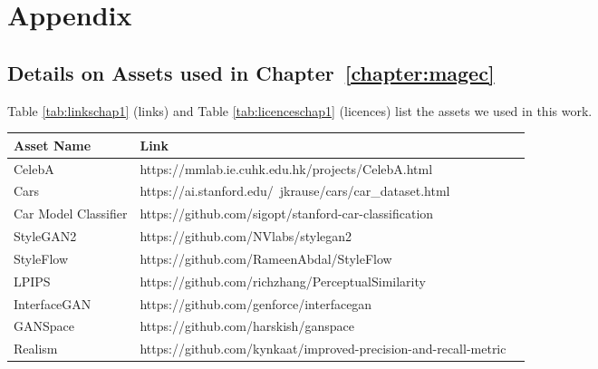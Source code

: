 \chapter{Appendix}
\label{chapter:appendix}

{}



\section{Details on Assets used in Chapter~\ref{chapter:magec}}
\label{sec:MAGEC assets}

Table \ref{tab:linkschap1} (links) and Table \ref{tab:licenceschap1} (licences)
list the assets we used in this work.

\begin{table*}[h]
\hspace{\sizeforappendix}
\small
\begin{tabular}{lll}
\toprule
\textbf{Asset Name} & \textbf{Link} \\
\midrule
CelebA & https://mmlab.ie.cuhk.edu.hk/projects/CelebA.html \\
Cars &  https://ai.stanford.edu/~jkrause/cars/car\_dataset.html \\
Car Model Classifier &  https://github.com/sigopt/stanford-car-classification \\
StyleGAN2 & https://github.com/NVlabs/stylegan2 \\
StyleFlow &  https://github.com/RameenAbdal/StyleFlow \\
LPIPS &  https://github.com/richzhang/PerceptualSimilarity \\
InterfaceGAN &  https://github.com/genforce/interfacegan \\
GANSpace &  https://github.com/harskish/ganspace \\
Realism &  https://github.com/kynkaat/improved-precision-and-recall-metric \\
\bottomrule
\end{tabular}
\caption{List of asset links.}
\label{tab:linkschap1}
\end{table*}


